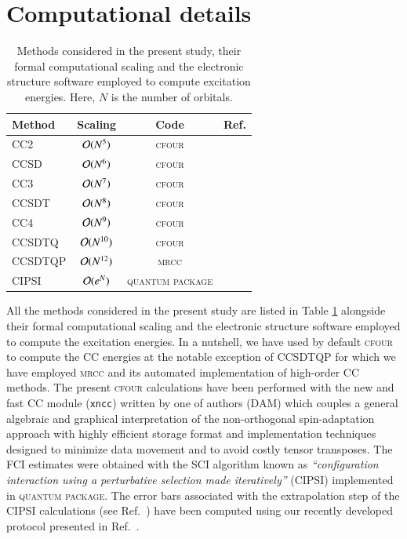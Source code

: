 \documentclass[aip,jcp,reprint,noshowkeys,superscriptaddress]{revtex4-1}
\newcommand{\QP}{\textsc{quantum package}}
\newcommand{\MRCC}{\textsc{mrcc}}
\newcommand{\CFOUR}{\textsc{cfour}}
\begin{document}
\section{Computational details}

\begin{table}
	\caption{Methods considered in the present study, their formal computational scaling and the electronic structure software employed to compute excitation energies.
	Here, $N$ is the number of orbitals.
	\label{tab:scaling}}
	\begin{ruledtabular}
	\begin{tabular}{lccc}
		Method	&	Scaling					&	Code		&	Ref.					\\
		\hline
		CC2			&	$\order*{N^{5}}$	&	\CFOUR		&	\onlinecite{cfour}		\\
		CCSD		&	$\order*{N^{6}}$	&	\CFOUR		&	\onlinecite{cfour}		\\
		CC3			&	$\order*{N^{7}}$	&	\CFOUR		&	\onlinecite{cfour}		\\
		CCSDT		&	$\order*{N^{8}}$	&	\CFOUR		&	\onlinecite{cfour}		\\
		CC4			&	$\order*{N^{9}}$	&	\CFOUR		&	\onlinecite{cfour}		\\
		CCSDTQ		&	$\order*{N^{10}}$	&	\CFOUR		&	\onlinecite{cfour}		\\
		CCSDTQP		&	$\order*{N^{12}}$	&	\MRCC		&	\onlinecite{mrcc}		\\	
		CIPSI		&	$\order*{e^{N}}$	&	\QP			&	\onlinecite{qp2}		\\
	\end{tabular}
	\end{ruledtabular}
\end{table}

All the methods considered in the present study are listed in Table \ref{tab:scaling} alongside their formal computational scaling and the electronic structure software employed to compute the excitation energies.
In a nutshell, we have used by default {\CFOUR} \cite{cfour} to compute the CC energies at the notable exception of CCSDTQP for which we have employed {\MRCC} and its automated implementation of high-order CC methods. \cite{mrcc}
The present {\CFOUR} calculations have been performed with the new and fast CC module (\texttt{xncc})  written by one of authors (DAM) which couples a general algebraic
and graphical interpretation of the non-orthogonal spin-adaptation approach with highly efficient storage format and implementation techniques designed to minimize data movement and to avoid costly tensor transposes. \cite{Matthews_2015b}
The FCI estimates were obtained with the SCI algorithm known as \textit{``configuration interaction using a perturbative selection made iteratively''} (CIPSI) implemented in {\QP}. \cite{qp2}
The error bars associated with the extrapolation step of the CIPSI calculations (see Ref.~) have been computed using our recently developed protocol presented in Ref.~.
\end{document}
